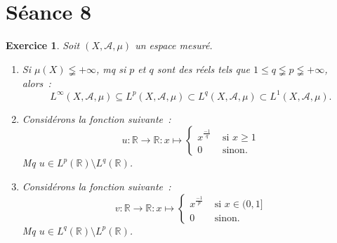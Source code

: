 \documentclass{article}
\newtheorem{ex}{Exercice}[section]
\newcommand{\pinfty}{{+\infty}}
\newcommand{\R}{{\mathbb R}}
\begin{document}
\section{Séance 8}
\begin{ex} Soit $(X, \mathcal A, \mu)$ un espace mesuré.
\begin{enumerate}
	\item Si $\mu(X) \lneqq \pinfty$, mq si $p$ et $q$ sont des réels tels que $1 \leq q \lneqq p \lneqq \pinfty$, alors~:
	\[L^\infty(X, \mathcal A, \mu) \subseteq L^p(X, \mathcal A, \mu) \subset L^q(X, \mathcal A, \mu) \subset L^1(X, \mathcal A, \mu).\]
	\item Considérons la fonction suivante~:
	\[u : \R \to \R : x \mapsto \begin{cases}x^{\frac {-1}q} &\text{ si } x \geq 1 \\0 &\text{ sinon}.\end{cases}\]
	Mq $u \in L^p(\R) \setminus L^q(\R)$.
	\item Considérons la fonction suivante~:
	\[v : \R \to \R : x \mapsto \begin{cases}x^{\frac {-1}p} &\text{ si } x \in (0, 1] \\0 &\text{ sinon}.\end{cases}\]
	Mq $u \in L^q(\R) \setminus L^p(\R)$.
\end{enumerate}
\end{ex}
\end{document}
